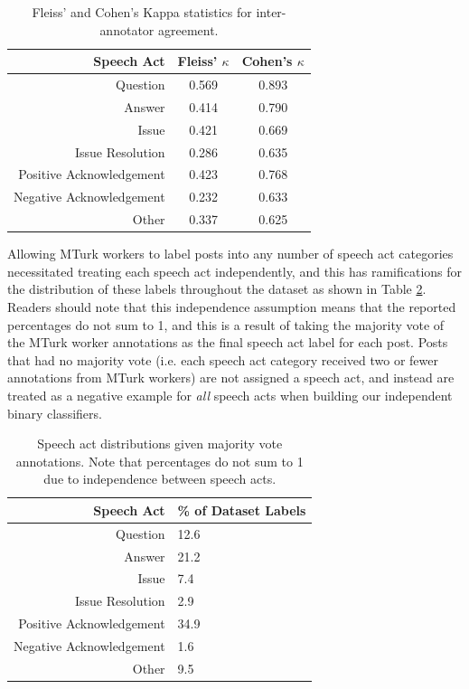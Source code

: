 \documentclass[twoside]{article}
\begin{document}
\begin{table}[h]
\centering
\begin{tabular*} {0.6\textwidth} { r | c | c }
\textbf{Speech Act} & \textbf{Fleiss' $\kappa$} & \textbf{Cohen's $\kappa$} \\ \hline
Question & 0.569 & 0.893 \\ \hline
Answer & 0.414 & 0.790 \\ \hline
Issue & 0.421 & 0.669 \\ \hline
Issue Resolution & 0.286 & 0.635 \\ \hline
Positive Acknowledgement & 0.423 & 0.768 \\ \hline
Negative Acknowledgement & 0.232 & 0.633 \\ \hline
Other & 0.337 & 0.625 \\
\end{tabular*}
\caption{Fleiss' and Cohen's Kappa statistics for inter-annotator agreement.}
\label{table: annotator-agreement}
\end{table}

Allowing MTurk workers to label posts into any number of speech act categories necessitated treating each speech act independently, and this has ramifications for the distribution of these labels throughout the dataset as shown in Table \ref{table:speech-act-distributions}. Readers should note that this independence assumption means that the reported percentages do not sum to 1, and this is a result of taking the majority vote of the MTurk worker annotations as the final speech act label for each post. Posts that had no majority vote (i.e. each speech act category received two or fewer annotations from MTurk workers) are not assigned a speech act, and instead are treated as a negative example for \emph{all} speech acts when building our independent binary classifiers.


\begin{table}[h]
\centering
\begin{tabular*} {0.5\textwidth} { r | p{4cm} }
\textbf{Speech Act} & \textbf{\% of Dataset Labels} \\ \hline
Question & 12.6\\ \hline
Answer & 21.2 \\ \hline
Issue & 7.4 \\ \hline
Issue Resolution & 2.9 \\ \hline
Positive Acknowledgement & 34.9 \\ \hline
Negative Acknowledgement & 1.6 \\ \hline
Other & 9.5 \\
\end{tabular*}
\caption{Speech act distributions given majority vote annotations. Note that percentages do not sum to 1 due to independence between speech acts.}
\label{table:speech-act-distributions}
\end{table}
\end{document}
